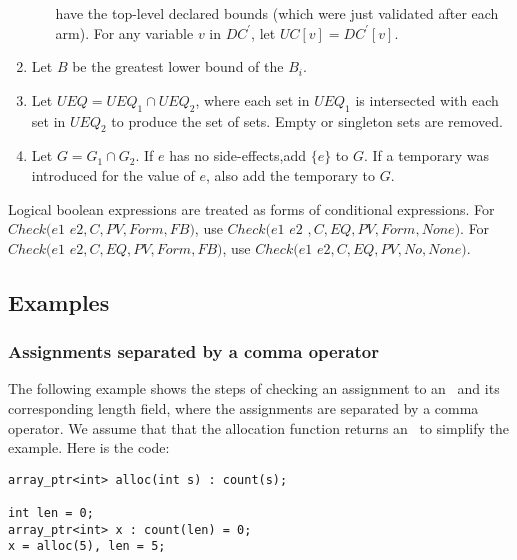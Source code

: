 \begin{enumerate}
\begin{enumerate}
have the top-level declared bounds (which were just validated after each arm).
For any variable $v$ in $DC^\prime$, let $\mathit{UC}[v] = DC^\prime[v]$.
\end{enumerate}
\item Let $B$ be the greatest lower bound of the $B_i$.
\item Let $UEQ = {UEQ}_1 \cap {UEQ}_2$,  where each set in $UEQ_1$ is intersected with each set in $UEQ_2$
to produce the set of sets.  Empty or singleton sets are removed.
\item Let $G = G_1 \cap G_2$.  If $e$ has no side-effects,add $\{ e \}$ to $G$.  If a
temporary was introduced for the value of $e$,  also add the temporary to $G$.
\end{enumerate}

Logical boolean expressions are treated as forms of conditional expressions.
For  $Check(e1$ \code{&&} $ e2, C, PV, Form, FB)$, use
$Check(e1$  $e2$ $, C, EQ, PV, Form, None)$.
For $Check(e1$ \code{ \|\| } $ e2, C, EQ, PV, Form, FB)$,  use
$Check(e1 $  $e2, C, EQ, PV, No, None)$.

\subsection{Examples}

\subsubsection{Assignments separated by a comma operator}

The following example shows the steps of checking an assignment to an \arrayptr\ and its corresponding
length field, where the assignments are separated by a comma operator.  We assume that that the allocation
function returns an \arrayptrint\ to simplify the example.  Here is the code:
\begin{lstlisting}
array_ptr<int> alloc(int s) : count(s);

int len = 0;
array_ptr<int> x : count(len) = 0;
x = alloc(5), len = 5;
\end{lstlisting}

